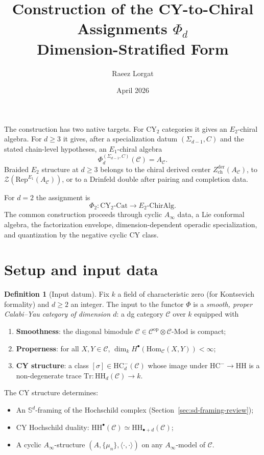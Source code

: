 \documentclass[11pt]{article}
\title{Construction of the CY-to-Chiral Assignments $\Phi_d$\\[4pt]
\large Dimension-Stratified Form}
\author{Raeez Lorgat}
\date{April 2026}
\theoremstyle{plain}
\theoremstyle{definition}
\newtheorem{definition}[theorem]{Definition}
\theoremstyle{remark}
\newcommand{\Ainf}{A_\infty}
\newcommand{\Eone}{E_1}
\newcommand{\Etwo}{E_2}
\newcommand{\Mod}{\mathrm{Mod}}
\newcommand{\Rep}{\mathrm{Rep}}
\newcommand{\Hom}{\mathrm{Hom}}
\newcommand{\op}{\mathrm{op}}
\newcommand{\CY}{\mathrm{CY}}
\newcommand{\HH}{\mathrm{HH}}
\newcommand{\HC}{\mathrm{HC}}
\newcommand{\Tr}{\mathrm{Tr}}
\newcommand{\Sd}{\mathbb{S}^d}
\newcommand{\cC}{\mathcal{C}}
\newcommand{\cZ}{\mathcal{Z}}
\begin{document}
\maketitle

\tableofcontents

\bigskip
The construction has two native targets. For CY$_2$ categories it gives
an $\Etwo$-chiral algebra. For $d \geq 3$ it gives, after a
specialization datum $(\Sigma_{d-1}, C)$ and the stated chain-level
hypotheses, an $\Eone$-chiral algebra
\[
\Phi_d^{(\Sigma_{d-1},C)}(\cC) = A_\cC .
\]
Braided $\Etwo$ structure at $d \geq 3$ belongs to the chiral derived
center $Z^{\mathrm{der}}_{\mathrm{ch}}(A_\cC)$, to
$\cZ(\Rep^{\Eone}(A_\cC))$, or to a Drinfeld double after pairing and
completion data.

For $d = 2$ the assignment is
\[
\Phi_2 \colon \CY_2\text{-}\mathrm{Cat} \longrightarrow \Etwo\text{-}\mathrm{ChirAlg}.
\]
The common construction proceeds through cyclic $\Ainf$ data, a Lie
conformal algebra, the factorization envelope, dimension-dependent
operadic specialization, and quantization by the negative cyclic CY
class.

\section{Setup and input data}
\label{sec:setup}

\begin{definition}[Input datum]
\label{def:input}
Fix $k$ a field of characteristic zero (for Kontsevich formality) and $d \geq 2$ an integer. The input to the functor $\Phi$ is a \emph{smooth, proper Calabi--Yau category of dimension $d$}: a dg category $\cC$ over $k$ equipped with
\begin{enumerate}[label=(\roman*)]
\item \textbf{Smoothness}: the diagonal bimodule $\cC \in \cC^{\op} \otimes \cC\text{-}\Mod$ is compact;
\item \textbf{Properness}: for all $X, Y \in \cC$, $\dim_k H^\bullet(\Hom_\cC(X,Y)) < \infty$;
\item \textbf{CY structure}: a class $[\sigma] \in \HC^-_d(\cC)$ whose image under $\HC^- \to \HH$ is a non-degenerate trace $\Tr \colon \HH_d(\cC) \to k$.
\end{enumerate}
The CY structure determines:
\begin{itemize}
\item An $\Sd$-framing of the Hochschild complex (Section~\ref{sec:sd-framing-review});
\item CY Hochschild duality: $\HH^\bullet(\cC) \simeq \HH_{\bullet+d}(\cC)$;
\item A cyclic $\Ainf$-structure $(A, \{\mu_n\}, \langle \cdot, \cdot \rangle)$ on any $\Ainf$-model of $\cC$.
\end{itemize}
\end{definition}
\end{document}
